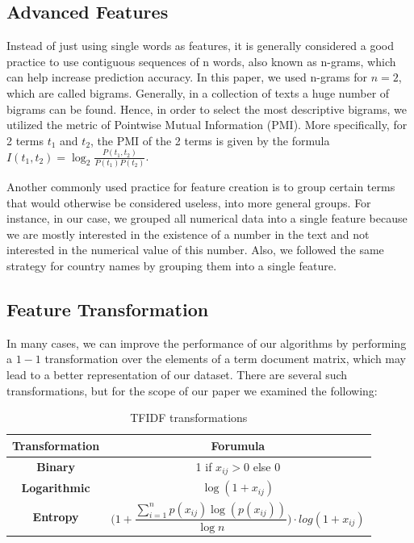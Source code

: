\documentclass[10pt,journal,compsoc]{IEEEtran}
\begin{document}
\subsection{Advanced Features}
Instead of just using single words as features, it is generally 
considered a good practice to use contiguous sequences of
n words, also known as n-grams, which can help increase
prediction accuracy.
In this paper, we used n-grams for $n=2$, which are called
bigrams.
Generally, in a collection of texts a huge number of bigrams
can be found.
Hence, in order to select the most descriptive bigrams, 
we utilized the metric of Pointwise Mutual Information (PMI).
More specifically, for 2 terms $t_1$ and $t_2$, the
PMI of the 2 terms is given by the formula 
$I(t_1,t_2)=\log_2\frac{P(t_1,t_2)}{P(t_1)P(t_2)}$.

Another commonly used practice for feature creation 
is to group certain terms that would otherwise be
considered useless, into more general groups.
For instance, in our case, we grouped all numerical
data into a single feature because we are mostly
interested in the existence of a number in the text
and not interested in the numerical value of 
this number.
Also, we followed the same strategy for country
names by grouping them into a single feature.

\subsection{Feature Transformation}
In many cases, we can improve the performance of
our algorithms by performing a $1-1$ transformation
over the elements of a term document matrix, which
may lead to a better representation of our dataset.
There are several such transformations, but for
the scope of our paper we examined the following:

\begin{table}[!h]
\renewcommand{\arraystretch}{2}
\caption{TFIDF transformations}
\label{transformation}
\centering
\begin{tabular}{|c|c|}
\hline
Transformation & Forumula\\
\hline
\textbf{Binary} & 1 if $x_{ij}>0$ else 0\\
\hline
\textbf{Logarithmic} & $\log(1+x_{ij})$\\
\hline
\textbf{Entropy} & $\Bigg(1+\dfrac{\sum_{i=1}^{n}p(x_{ij})\log(p(x_{ij}))}{\log{n}}\Bigg)\cdot log(1+x_{ij})$\\
\hline
\end{tabular}
\end{table}
 
\end{document}

